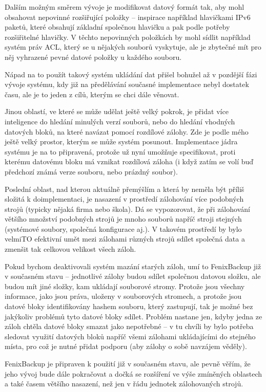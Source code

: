 
Dalším možným směrem vývoje je modifikovat datový formát tak, aby mohl obsahovat
nepovinné rozšiřující položky -- inspirace například hlavičkami IPv6 paketů,
které obsahují základní společnou hlavičku a pak podle potřeby rozšiřitelné
hlavičky. V těchto nepovinných položkách by mohl sídlit například systém práv
\gls{ACL}, který se u nějakých souborů vyskytuje, ale je zbytečné mít pro něj
vyhrazené pevné datové položky u každého souboru.

Nápad na to použít takový systém ukládání dat přišel bohužel až v pozdější fázi
vývoje systému, kdy již na předělávání současné implementace nebyl dostatek
času, ale je to jeden z cílů, kterým se chci dále věnovat.

Jinou oblastí, ve které se může udělat ještě velký pokrok, je přidat více
inteligence do hledání minulých verzí souborů, nebo do hledání vhodných datových
bloků, na které navázat pomocí rozdílové zálohy. Zde je podle mého ještě velký
prostor, kterým se může systém posunout. Implementace jádra systému je na to
připravená, protože už nyní umožňuje specifikovat, proti kterému datovému bloku
má vznikat rozdílová záloha (i když zatím se volí buď předchozí známá verze
souboru, nebo prázdný soubor).

Poslední oblast, nad kterou aktuálně přemýšlím a která by neměla být příliš
složitá k doimplementaci, je nasazení v prostředí zálohování více podobných
strojů (typicky nějaká firma nebo škola). Dá se vypozorovat, že při zálohování
většího množství podobných strojů je mnoho souborů napříč stroji stejných
(systémové soubory, společná konfigurace aj.). V takovém prostředí by bylo velmiTO
efektivní umět mezi zálohami různých strojů sdílet společná data a zmenšit tak
celkovou velikost všech záloh.

Pokud bychom deaktivovali systém mazání starých záloh, umí to FenixBackup již
v současném stavu -- jednotlivé zálohy budou sdílet společnou datovou složku,
ale budou mít jiné složky, kam ukládají souborové stromy. Protože jsou všechny
informace, jako jsou práva, uloženy v souborových stromech, a protože jsou
datové bloky identifikovány hashem souboru, který zastupují, tak je možné bez
jakýkoliv problémů tyto datové bloky sdílet. Problém nastane jen, kdyby jedna
ze záloh chtěla datové bloky smazat jako nepotřebné -- v tu chvíli by bylo
potřeba sledovat využití datových bloků napříč všemi zálohami ukládajícími do
stejného místa, pro což je nutné přidat podporu (aby zálohy o sobě navzájem
věděly).

FenixBackup je připraven k použití již v současném stavu, ale pevně věřím,
že jeho vývoj bude dále pokračovat a dočká se rozšíření ve výše zmíněných
oblastech a také časem většího nasazení, než jen v řádu jednotek zálohovaných
strojů.
